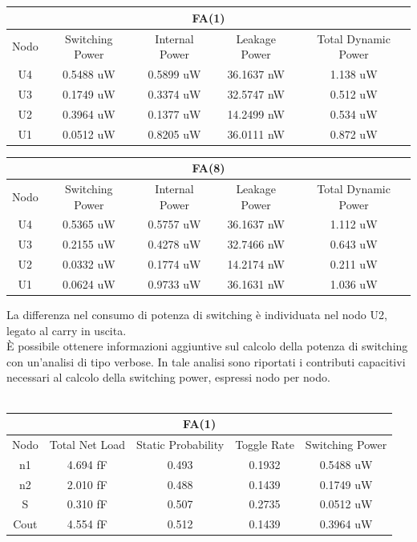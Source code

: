 \documentclass[11pt,  english, makeidx, a4paper, titlepage, oneside]{book}
\begin{document}
\\\\
\begin{center}
	\begin{tabular}{|c|c|c|c|c|}
	\multicolumn{5}{c}{FA(1) }\\
	\hline
	Nodo &  Switching Power & Internal Power & Leakage Power & Total Dynamic Power \\ 
	\hline
	U4 & 0.5488 uW & 0.5899 uW & 36.1637 nW & 1.138 uW  \\
	\hline
	U3 & 0.1749 uW & 0.3374 uW & 32.5747 nW & 0.512 uW  \\
	\hline
	U2 & 0.3964 uW & 0.1377 uW & 14.2499 nW & 0.534 uW  \\
	\hline
	U1 & 0.0512 uW & 0.8205 uW & 36.0111 nW & 0.872 uW  \\
	\hline
	\end{tabular}
\end{center}
\vspace{0.3cm}
\begin{center}
	\begin{tabular}{|c|c|c|c|c|}
	\multicolumn{5}{c}{FA(8) }\\
	\hline
	Nodo &  Switching Power & Internal Power & Leakage Power & Total Dynamic Power \\ 
	\hline
	U4 & 0.5365 uW & 0.5757 uW & 36.1637 nW & 1.112 uW  \\
	\hline
	U3 & 0.2155 uW & 0.4278 uW & 32.7466 nW & 0.643 uW  \\
	\hline
	U2 & 0.0332 uW & 0.1774 uW & 14.2174 nW & 0.211 uW  \\
	\hline
	U1 & 0.0624 uW & 0.9733 uW & 36.1631 nW & 1.036 uW  \\
	\hline
	\end{tabular}
\end{center}
\vspace{0.3cm}
La differenza nel consumo di potenza di switching è individuata nel nodo U2, legato al carry in uscita.
\\
È possibile ottenere informazioni aggiuntive sul calcolo della potenza di switching con un'analisi di tipo verbose. In tale analisi sono riportati i contributi capacitivi necessari al calcolo della switching power, espressi nodo per nodo.
\\\\
\begin{center}
	\begin{tabular}{|c|c|c|c|c|}
	\multicolumn{5}{c}{FA(1) }\\
	\hline
	Nodo &  Total Net Load & Static Probability & Toggle Rate & Switching Power \\ 
	\hline
	n1 & 4.694 fF & 0.493 & 0.1932 & 0.5488 uW  \\
	\hline
	n2 & 2.010 fF & 0.488 & 0.1439 & 0.1749 uW  \\
	\hline
	S & 0.310 fF & 0.507 & 0.2735 & 0.0512 uW  \\
	\hline
	Cout & 4.554 fF & 0.512 &  0.1439 & 0.3964 uW  \\
	\hline
	\end{tabular}
\end{center}
\end{document}
